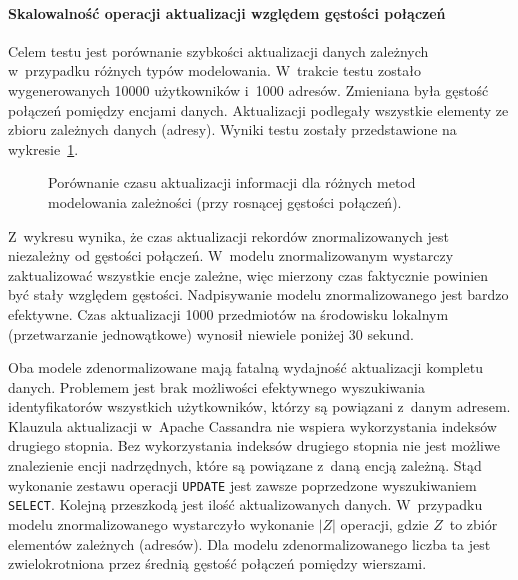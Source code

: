 \paragraph{Skalowalność operacji aktualizacji względem gęstości połączeń} 

Celem testu jest porównanie szybkości aktualizacji danych zależnych w~przypadku różnych typów modelowania. W~trakcie testu zostało wygenerowanych 10000 użytkowników i~1000 adresów. Zmieniana była gęstość połączeń pomiędzy encjami danych. Aktualizacji podlegały wszystkie elementy ze zbioru zależnych danych (adresy). Wyniki testu zostały przedstawione na wykresie~\ref{fig:update_time_relation_density_comparison}.

\begin{figure}[ht!]
	\centering

	\caption{Porównanie czasu aktualizacji informacji dla różnych metod modelowania zależności (przy rosnącej gęstości połączeń).}
	\label{fig:update_time_relation_density_comparison}
\end{figure}

Z~wykresu wynika, że czas aktualizacji rekordów znormalizowanych jest niezależny od gęstości połączeń. W~modelu znormalizowanym wystarczy zaktualizować wszystkie encje zależne, więc mierzony czas faktycznie powinien być stały względem gęstości. Nadpisywanie modelu znormalizowanego jest bardzo efektywne. Czas aktualizacji 1000 przedmiotów na środowisku lokalnym (przetwarzanie jednowątkowe) wynosił niewiele poniżej 30 sekund. 

Oba modele zdenormalizowane mają fatalną wydajność aktualizacji kompletu danych. Problemem jest brak możliwości efektywnego wyszukiwania identyfikatorów wszystkich użytkowników, którzy są powiązani z~danym adresem. Klauzula aktualizacji w~Apache Cassandra nie wspiera wykorzystania indeksów drugiego stopnia. Bez wykorzystania indeksów drugiego stopnia nie jest możliwe znalezienie encji nadrzędnych, które są powiązane z~daną encją zależną. Stąd wykonanie zestawu operacji \verb+UPDATE+ jest zawsze poprzedzone wyszukiwaniem \verb+SELECT+. Kolejną przeszkodą jest ilość aktualizowanych danych. W~przypadku modelu znormalizowanego wystarczyło wykonanie $|Z|$ operacji, gdzie $Z$~to zbiór elementów zależnych (adresów). Dla modelu zdenormalizowanego liczba ta jest zwielokrotniona przez średnią gęstość połączeń pomiędzy wierszami.

